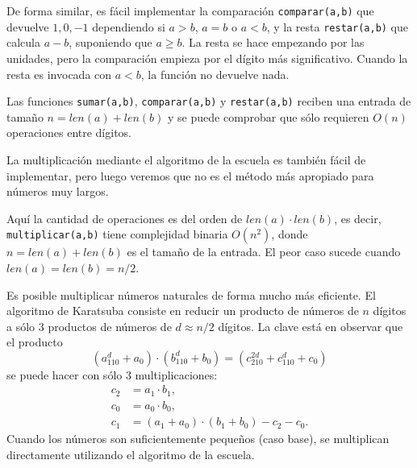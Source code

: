 \documentclass[a4paper, 11pt]{article}
\theoremstyle{plain}
\theoremstyle{definition}
\begin{document}
\bigskip

De forma similar, es fácil implementar la comparación
\texttt{comparar(a,b)} que devuelve $1,0,-1$ dependiendo
si $a>b$, $a=b$ o $a<b$, y la resta \texttt{restar(a,b)}
que calcula $a-b$, suponiendo que $a\geq b$. La resta se hace empezando
por las unidades, pero la comparación empieza por el dígito más
significativo. Cuando la resta es invocada con $a<b$, la función
no devuelve nada.

\bigskip



\bigskip



\bigskip

Las funciones \texttt{sumar(a,b)}, \texttt{comparar(a,b)} y \texttt{restar(a,b)}
reciben una entrada de tamaño $n=len(a)+len(b)$ y se puede comprobar que sólo 
requieren $O(n)$ operaciones entre dígitos.

\bigskip

La multiplicación mediante el algoritmo de la escuela es también fácil de
implementar, pero luego veremos que no es el método más apropiado para números
muy largos.

\bigskip



\bigskip

Aquí la cantidad de operaciones es del orden de $len(a)\cdot len(b)$, es
decir, \texttt{multiplicar(a,b)} tiene complejidad binaria $O(n^2)$,
donde $n=len(a)+len(b)$ es el tamaño de la entrada. El peor caso
sucede cuando $len(a)=len(b)=n/2$.

\bigskip

Es posible multiplicar números naturales de forma mucho más eficiente.
El algoritmo de Karatsuba consiste en reducir un producto de números de
$n$ dígitos a sólo 3 productos de números de $d\approx n/2$ dígitos.
La clave está en observar que el producto
\[
   (a_110^d + a_0)\cdot (b_110^d + b_0) =
   (c_210^{2d} + c_110^d + c_0)
\]
se puede hacer con sólo 3 multiplicaciones:
\[
\begin{aligned}
   c_2  &= a_1\cdot b_1, \\
   c_0  &= a_0\cdot b_0, \\
   c_1  &= (a_1+a_0)\cdot (b_1+b_0)-c_2-c_0.
\end{aligned}
\]
Cuando los números son suficientemente pequeños (caso base), se multiplican
directamente utilizando el algoritmo de la escuela.
\end{document}
